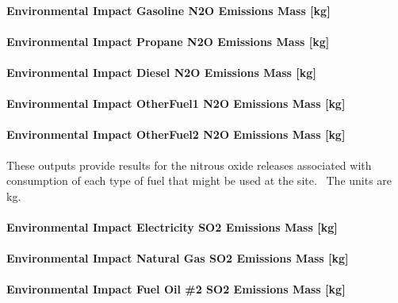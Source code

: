 \paragraph{Environmental Impact Gasoline N2O Emissions Mass {[}kg{]}}\label{environmental-impact-gasoline-n2o-emissions-mass-kg}

\paragraph{Environmental Impact Propane N2O Emissions Mass {[}kg{]}}\label{environmental-impact-propane-n2o-emissions-mass-kg}

\paragraph{Environmental Impact Diesel N2O Emissions Mass {[}kg{]}}\label{environmental-impact-diesel-n2o-emissions-mass-kg}

\paragraph{Environmental Impact OtherFuel1 N2O Emissions Mass {[}kg{]}}\label{environmental-impact-otherfuel1-n2o-emissions-mass-kg}

\paragraph{Environmental Impact OtherFuel2 N2O Emissions Mass {[}kg{]}}\label{environmental-impact-otherfuel2-n2o-emissions-mass-kg}

These outputs provide results for the nitrous oxide releases associated with consumption of each type of fuel that might be used at the site.~ The units are kg.

\paragraph{Environmental Impact Electricity SO2 Emissions Mass {[}kg{]}}\label{environmental-impact-electricity-so2-emissions-mass-kg}

\paragraph{Environmental Impact Natural Gas SO2 Emissions Mass {[}kg{]}}\label{environmental-impact-natural-gas-so2-emissions-mass-kg}

\paragraph{Environmental Impact Fuel Oil \#2 SO2 Emissions Mass {[}kg{]}}\label{environmental-impact-fuel-oil-2-so2-emissions-mass-kg}


